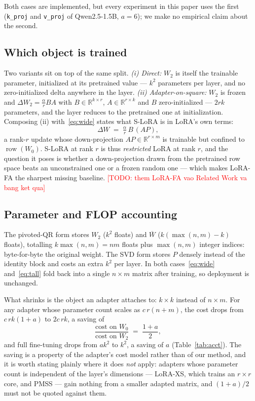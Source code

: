 \documentclass{article}
\newcommand{\TODO}[1]{\textcolor{red}{[TODO: #1]}}
\begin{document}
Both cases are implemented, but every experiment in this paper uses the first
(\texttt{k\_proj} and \texttt{v\_proj} of Qwen2.5-1.5B, $a=6$); we make no
empirical claim about the second.

\subsection{Which object is trained}
Two variants sit on top of the same split. \emph{(i) Direct:} $W_2$ is itself
the trainable parameter, initialized at its pretrained value --- $k^2$
parameters per layer, and no zero-initialized delta anywhere in the layer.
\emph{(ii) Adapter-on-square:} $W_2$ is frozen and
$\Delta W_2=\tfrac{\alpha}{r}BA$ with $B\in\mathbb{R}^{k\times r}$,
$A\in\mathbb{R}^{r\times k}$ and $B$ zero-initialized --- $2rk$ parameters, and
the layer reduces to the pretrained one at initialization. Composing (ii)
with~\eqref{eq:wide} states what S-LoRA is in LoRA's own terms:
\begin{equation}
  \Delta W \;=\; \tfrac{\alpha}{r}\,B\,(A P),
  \label{eq:restricted-lora}
\end{equation}
a rank-$r$ update whose down-projection $AP\in\mathbb{R}^{r\times m}$ is
trainable but confined to $\operatorname{row}(W_0)$. S-LoRA at rank $r$ is thus
\emph{restricted} LoRA at rank $r$, and the question it poses is whether a
down-projection drawn from the pretrained row space beats an unconstrained one
or a frozen random one --- which makes LoRA-FA the sharpest missing baseline.
\TODO{them LoRA-FA vao Related Work va bang ket qua}

\subsection{Parameter and FLOP accounting}
\label{sec:acct}
The pivoted-QR form stores $W_2$ ($k^2$ floats) and $\overline{W}$
($k(\max(n,m)-k)$ floats), totalling $k\max(n,m)=nm$ floats plus $\max(n,m)$
integer indices: byte-for-byte the original weight. The SVD form stores $P$
densely instead of the identity block and costs an extra $k^2$ per layer. In
both cases~\eqref{eq:wide} and~\eqref{eq:tall} fold back into a single
$n\times m$ matrix after training, so deployment is unchanged.

What shrinks is the object an adapter attaches to: $k\times k$ instead of
$n\times m$. For any adapter whose parameter count scales as $c\,r(n+m)$, the
cost drops from $c\,rk(1+a)$ to $2c\,rk$, a saving of
\begin{equation}
  \frac{\text{cost on }W_0}{\text{cost on }W_2}\;=\;\frac{1+a}{2},
  \label{eq:saving}
\end{equation}
and full fine-tuning drops from $ak^2$ to $k^2$, a saving of $a$
(Table~\ref{tab:acct}). The saving is a property of the adapter's cost model
rather than of our method, and it is worth stating plainly where it does
\emph{not} apply: adapters whose parameter count is independent of the layer's
dimensions --- LoRA-XS, which trains an $r\times r$ core, and PMSS
\citep{wang2024pmss} --- gain nothing from a smaller adapted matrix, and
$(1+a)/2$ must not be quoted against them.
\end{document}
